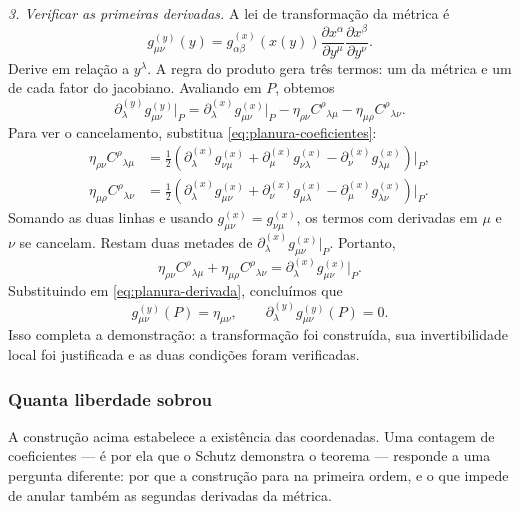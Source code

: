 \documentclass[12pt,a4paper,oneside]{book}
\theoremstyle{rgplain}
\theoremstyle{rgremark}
\begin{document}
\emph{3. Verificar as primeiras derivadas.} A lei de transformação da
métrica é
\[
  g^{(y)}_{\mu\nu}(y)
  =g^{(x)}_{\alpha\beta}(x(y))
    \frac{\partial x^\alpha}{\partial y^\mu}
    \frac{\partial x^\beta}{\partial y^\nu}.
\]
Derive em relação a $y^\lambda$. A regra do produto gera três termos: um
da métrica e um de cada fator do jacobiano. Avaliando em $P$, obtemos
\begin{equation}
  \partial^{(y)}_\lambda g^{(y)}_{\mu\nu}\big|_P
  =\partial^{(x)}_\lambda g^{(x)}_{\mu\nu}\big|_P
   -\eta_{\rho\nu}C^\rho{}_{\lambda\mu}
   -\eta_{\mu\rho}C^\rho{}_{\lambda\nu}.
  \label{eq:planura-derivada}
\end{equation}
Para ver o cancelamento, substitua \eqref{eq:planura-coeficientes}:
\begin{align*}
  \eta_{\rho\nu}C^\rho{}_{\lambda\mu}
  &=\frac12\left(
    \partial^{(x)}_\lambda g^{(x)}_{\nu\mu}
   +\partial^{(x)}_\mu g^{(x)}_{\nu\lambda}
   -\partial^{(x)}_\nu g^{(x)}_{\lambda\mu}\right)\Big|_P,\\
  \eta_{\mu\rho}C^\rho{}_{\lambda\nu}
  &=\frac12\left(
    \partial^{(x)}_\lambda g^{(x)}_{\mu\nu}
   +\partial^{(x)}_\nu g^{(x)}_{\mu\lambda}
   -\partial^{(x)}_\mu g^{(x)}_{\lambda\nu}\right)\Big|_P.
\end{align*}
Somando as duas linhas e usando $g^{(x)}_{\mu\nu}=g^{(x)}_{\nu\mu}$, os
termos com derivadas em $\mu$ e $\nu$ se cancelam. Restam duas metades de
$\partial^{(x)}_\lambda g^{(x)}_{\mu\nu}|_P$. Portanto,
\[
  \eta_{\rho\nu}C^\rho{}_{\lambda\mu}
  +\eta_{\mu\rho}C^\rho{}_{\lambda\nu}
  =\partial^{(x)}_\lambda g^{(x)}_{\mu\nu}\big|_P.
\]
Substituindo em \eqref{eq:planura-derivada}, concluímos que
\[
  \boxed{\quad g^{(y)}_{\mu\nu}(P)=\eta_{\mu\nu},
  \qquad \partial^{(y)}_\lambda g^{(y)}_{\mu\nu}(P)=0.\quad}
\]
Isso completa a demonstração: a transformação foi construída, sua
invertibilidade local foi justificada e as duas condições foram verificadas.

\subsubsection*{Quanta liberdade sobrou}

A construção acima estabelece a existência das coordenadas. Uma contagem de
coeficientes --- é por ela que o Schutz demonstra o teorema --- responde a
uma pergunta diferente: por que a construção para na primeira ordem, e o que
impede de anular também as segundas derivadas da métrica.
\end{document}
